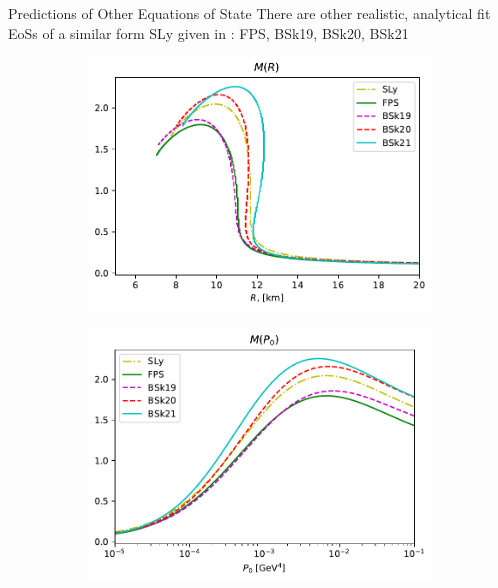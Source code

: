 \documentclass[handout]{beamer}
\begin{document}
    \begin{frame}{Predictions of Other Equations of State}
        \pause
        There are other realistic, analytical fit EoSs of a similar form SLy given in \autocite{SLy_2004,BSk_2013}: \pause FPS, BSk19, BSk20, BSk21 \pause
        \vspace{-10pt}
        \begin{figure}[h!]
            \centering
            \begin{subfigure}{.5\textwidth}
                \includegraphics[width = \textwidth]{r_analysis,all.pdf}
            \end{subfigure}%
            \begin{subfigure}{.5\textwidth}
                \includegraphics[width = \textwidth]{p0_analysis,all.pdf} 

\end{subfigure}
\end{figure}
\end{frame}
\end{document}
